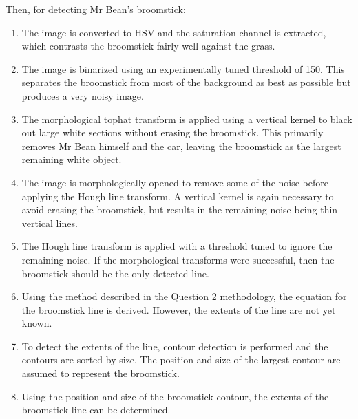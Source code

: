 Then, for detecting Mr Bean's broomstick:
\begin{enumerate}
  \item The image is converted to HSV and the saturation channel is extracted, which contrasts the broomstick fairly well against the grass.

  \item The image is binarized using an experimentally tuned threshold of 150. This separates the broomstick from most of the background as best as possible but produces a very noisy image.

  \item The morphological tophat transform is applied using a vertical kernel to black out large white sections without erasing the broomstick. This primarily removes Mr Bean himself and the car, leaving the broomstick as the largest remaining white object.

  \item The image is morphologically opened to remove some of the noise before applying the Hough line transform. A vertical kernel is again necessary to avoid erasing the broomstick, but results in the remaining noise being thin vertical lines.

  \item The Hough line transform is applied with a threshold tuned to ignore the remaining noise. If the morphological transforms were successful, then the broomstick should be the only detected line.

  \item Using the method described in the Question 2 methodology, the equation for the broomstick line is derived. However, the extents of the line are not yet known.

  \item To detect the extents of the line, contour detection is performed and the contours are sorted by size. The position and size of the largest contour are assumed to represent the broomstick.

  \item Using the position and size of the broomstick contour, the extents of the broomstick line can be determined.

\end{enumerate}

